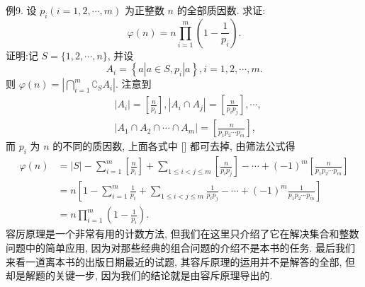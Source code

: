 例9. 设 $p_i(i=1,2, \cdots, m)$ 为正整数 $n$ 的全部质因数.
求证:
$$
\varphi(n)=n \prod_{i=1}^m\left(1-\frac{1}{p_i}\right) .
$$
证明:记 $S=\{1,2, \cdots, n\}$, 并设
$$
A_i=\left\{a\left|a \in S, p_i\right| a\right\}, i=1,2, \cdots, m .
$$
则 $\varphi(n)=\left|\bigcap_{i=1}^m \complement_S A_i\right|$. 注意到
$$
\begin{aligned}
& \left|A_i\right|=\left[\frac{n}{p_i}\right],\left|A_i \cap A_j\right|=\left[\frac{n}{p_i p_j}\right], \cdots, \\
& \left|A_1 \cap A_2 \cap \cdots \cap A_m\right|=\left[\frac{n}{p_1 p_2 \cdots p_m}\right],
\end{aligned}
$$
而 $p_i$ 为 $n$ 的不同的质因数, 上面各式中 [] 都可去掉, 由筛法公式得
$$
\begin{aligned}
\varphi(n) & =|S|-\sum_{i=1}^m\left[\frac{n}{p_i}\right]+\sum_{1 \leqslant i<j \leqslant m}\left[\frac{n}{p_i p_j}\right]-\cdots+(-1)^m\left[\frac{n}{p_1 p_2 \cdots p_m}\right] \\
& =n\left[1-\sum_{i=1}^m \frac{1}{p_i}+\sum_{1 \leqslant i<j \leqslant m} \frac{1}{p_i p_j}-\cdots+(-1)^m \frac{1}{p_1 p_2 \cdots p_m}\right] \\
& =n \prod_{i=1}^m\left(1-\frac{1}{p_i}\right) .
\end{aligned}
$$
容厉原理是一个非常有用的计数方法, 但我们在这里只介绍了它在解决集合和整数问题中的简单应用, 因为对那些经典的组合问题的介绍不是本书的任务.
最后我们来看一道离本书的出版日期最近的试题, 其容斥原理的运用并不是解答的全部, 但却是解题的关键一步, 因为我们的结论就是由容斥原理导出的.



